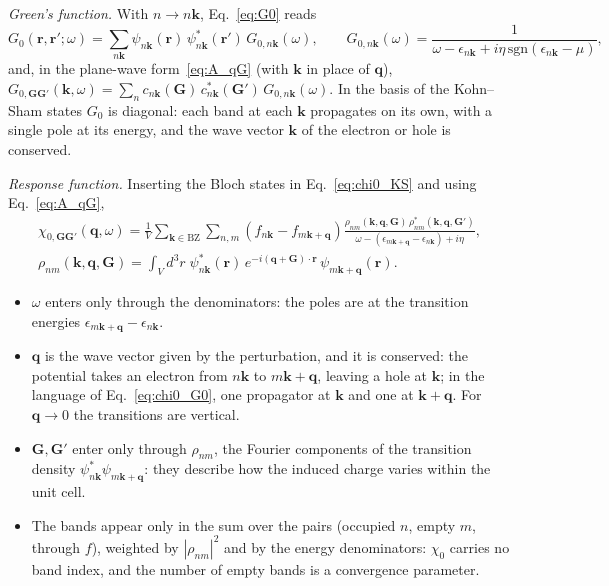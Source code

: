 \documentclass[10pt,a4paper]{paper}
\begin{document}
\emph{Green's function.} With $n \to n\bm{k}$, Eq.~\eqref{eq:G0} reads
\begin{equation}
G_0(\bm{r},\bm{r}';\omega) = \sum_{n\bm{k}} \psi_{n\bm{k}}(\bm{r})\,\psi_{n\bm{k}}^*(\bm{r}')\,G_{0,n\bm{k}}(\omega) ,
\qquad
G_{0,n\bm{k}}(\omega) = \frac{1}{\omega - \epsilon_{n\bm{k}} + i\eta\,\mathrm{sgn}(\epsilon_{n\bm{k}} - \mu)} ,
\label{eq:G0_bloch}
\end{equation}
and, in the plane-wave form~\eqref{eq:A_qG} (with $\bm{k}$ in place of $\bm{q}$),
$G_{0,\bm{G}\bm{G}'}(\bm{k},\omega) = \sum_n c_{n\bm{k}}(\bm{G})\,c_{n\bm{k}}^*(\bm{G}')\,G_{0,n\bm{k}}(\omega)$. In
the basis of the Kohn--Sham states $G_0$ is diagonal: each band at each $\bm{k}$ propagates on its own, with a single
pole at its energy, and the wave vector $\bm{k}$ of the electron or hole is conserved.

\emph{Response function.} Inserting the Bloch states in Eq.~\eqref{eq:chi0_KS} and using
Eq.~\eqref{eq:A_qG},
\begin{gather}
\chi_{0,\bm{G}\bm{G}'}(\bm{q},\omega) = \frac{1}{V}\sum_{\bm{k}\in\mathrm{BZ}}\sum_{n,m}
\left(f_{n\bm{k}} - f_{m\bm{k}+\bm{q}}\right)
\frac{\rho_{nm}(\bm{k},\bm{q},\bm{G})\,\rho_{nm}^*(\bm{k},\bm{q},\bm{G}')}
{\omega - (\epsilon_{m\bm{k}+\bm{q}} - \epsilon_{n\bm{k}}) + i\eta} ,
\nonumber \\
\rho_{nm}(\bm{k},\bm{q},\bm{G}) = \int_V d^3r\;\psi_{n\bm{k}}^*(\bm{r})\,e^{-i(\bm{q} + \bm{G})\cdot\bm{r}}\,
\psi_{m\bm{k}+\bm{q}}(\bm{r}) .
\label{eq:chi0_qG}
\end{gather}
\begin{itemize}
\item $\omega$ enters only through the denominators: the poles are at the transition energies
  $\epsilon_{m\bm{k}+\bm{q}} - \epsilon_{n\bm{k}}$.
\item $\bm{q}$ is the wave vector given by the perturbation, and it is conserved: the potential takes an electron from
  $n\bm{k}$ to $m\bm{k}+\bm{q}$, leaving a hole at $\bm{k}$; in the language of Eq.~\eqref{eq:chi0_G0}, one
  propagator at $\bm{k}$ and one at $\bm{k} + \bm{q}$. For $\bm{q} \to 0$ the transitions are vertical.
\item $\bm{G},\bm{G}'$ enter only through $\rho_{nm}$, the Fourier components of the transition density
  $\psi_{n\bm{k}}^*\psi_{m\bm{k}+\bm{q}}$: they describe how the induced charge varies within the unit cell.
\item The bands appear only in the sum over the pairs (occupied $n$, empty $m$, through $f$), weighted by
  $|\rho_{nm}|^2$ and by the energy denominators: $\chi_0$ carries no band index, and the number of empty bands is a
  convergence parameter.
\end{itemize}
\end{document}
